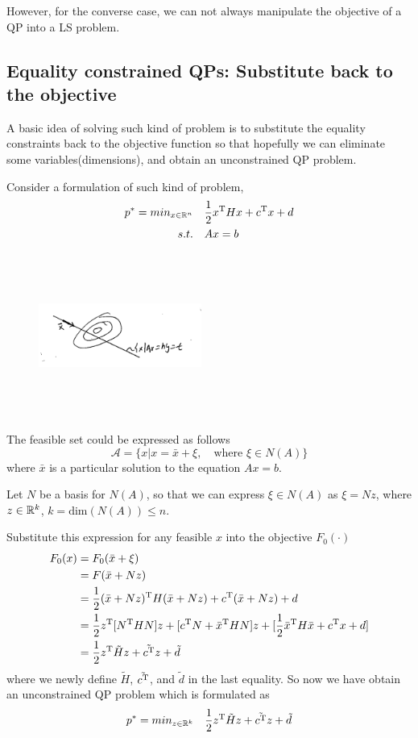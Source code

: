 However, for the converse case, we can not always manipulate the objective of a QP into a  LS problem.


\subsection{Equality constrained QPs: Substitute back to the objective}
A basic idea of solving such kind of problem is to substitute the equality constraints back to the objective function so that hopefully we can eliminate some variables(dimensions), and obtain an unconstrained QP problem.

Consider a formulation of such kind of problem,
\begin{align*}
p^* = min_{x\in \mathbb{R}^n}\quad &\frac{1}{2}x^{{\rm T}}Hx + c^{{\rm T}}x + d\\
s.t.\quad &Ax = b
\end{align*}


\begin{figure}
	\centering
	\includegraphics[width=2.1in,height=2.1in]{figures/ch07/figure1016_b.png}
\end{figure}

The feasible set could be expressed as follows
$$\mathcal{A} =\{x | x = \bar{x} + \xi,\quad \text{where } \xi \in N(A) \}$$
where $\bar{x}$ is a particular solution to the equation $Ax=b$.

Let $N$ be a basis for $N(A)$, so that we can express $\xi \in N(A)$ as $\xi = Nz$, where $z\in \mathbb{R}^k$, $k =\text{dim}(N(A)) \leq n$.

Substitute this expression for any feasible $x$ into the objective $F_0(\cdot)$
\begin{align*}
F_0(x) 
&= F_0(\bar{x} + \xi)\\
&= F(\bar{x} + Nz)\\
&= \frac{1}{2}(\bar{x} + Nz)^{{\rm T}}H(\bar{x}+Nz) + c^{{\rm T}}(\bar{x} + Nz) + d\\
&= \frac{1}{2}z^{{\rm T}}[N^{{\rm T}}HN]z + [c^{{\rm T}}N + \bar{x}^{{\rm T}}HN]z + [\frac{1}{2}\bar{x}^{{\rm T}}H\bar{x} + c^{{\rm T}}x + d] \\
&= \frac{1}{2}z^{{\rm T}}\tilde{H}z + \tilde{c^{{\rm T}}}z + \tilde{d}\\
\end{align*}
where we newly define $\tilde{H}$, $\tilde{c^{{\rm T}}}$, and $\tilde{d}$ in the last equality. So now we have obtain an unconstrained QP problem which is formulated as
\begin{equation*}
p^* = min_{z\in \mathbb{R}^k}\quad \frac{1}{2}z^{{\rm T}}\tilde{H}z + \tilde{c^{{\rm T}}}z + \tilde{d}
\end{equation*}

